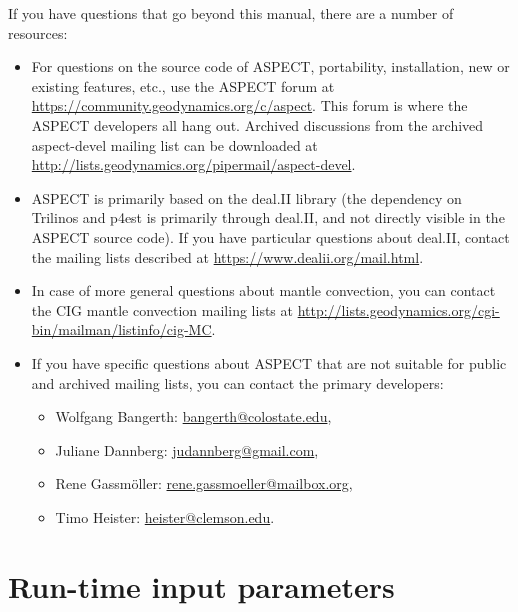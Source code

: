 \documentclass{article}
\newcommand{\aspect}{\textsc{ASPECT}}
\begin{document}
If you have questions that go beyond this manual, there are a number of
resources:
\begin{itemize}
\item For questions on the source code of \aspect{}, portability, installation, new or existing features,
  etc., use the \aspect{} forum at
  \url{https://community.geodynamics.org/c/aspect}. This
  forum is where the \aspect{} developers all hang out. Archived
  discussions from the archived aspect-devel mailing list can
  be downloaded at \url{http://lists.geodynamics.org/pipermail/aspect-devel}.

\item \aspect{} is primarily based on the deal.II library (the dependency
  on Trilinos and p4est is primarily through deal.II, and not directly
  visible in the \aspect{} source code). If you have particular questions
  about deal.II, contact
  the mailing lists described at \url{https://www.dealii.org/mail.html}.

\item In case of more general questions about mantle convection, you can
  contact the CIG mantle
  convection mailing lists at 
  \url{http://lists.geodynamics.org/cgi-bin/mailman/listinfo/cig-MC}.

\item If you have specific questions about \aspect{} that are not suitable
  for public and archived mailing lists, you can contact the
  primary developers:
  \begin{itemize}
  \item Wolfgang
    Bangerth: \url{bangerth@colostate.edu},
  \item Juliane
    Dannberg: \url{judannberg@gmail.com},
  \item Rene
    Gassm{\"o}ller: \url{rene.gassmoeller@mailbox.org},
  \item Timo
    Heister: \url{heister@clemson.edu}.
  \end{itemize}
\end{itemize}


\appendix

\section{Run-time input parameters}
\label{sec:parameters}




\pagebreak
\end{document}
